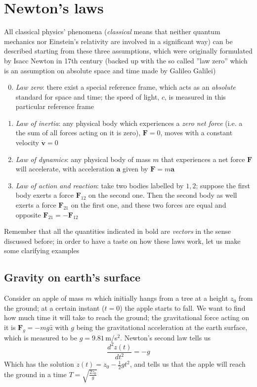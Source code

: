 \section{Newton's laws}
All classical physics' phenomena (\textit{classical} means that neither quantum mechanics nor Einstein's relativity are involved in a significant way) can be described starting from these three assumptions, which were originally formulated by Isacc Newton in 17th century (backed up with the so called ''law zero'' which is an assumption on absolute space and time made by Galileo Galilei)
\begin{enumerate}
\setcounter{enumi}{-1}
\item \textit{Law zero}: there exist a special reference frame, which acts as an \textit{absolute} standard for space and time; the speed of light, $c$, is measured in this particular reference frame 
\item \textit{Law of inertia}: any physical body which experiences a \textit{zero net force} (i.e. a the sum of all forces acting on it is zero), $\mathbf{F}=0$, moves with a constant velocity $\dot{\mathbf{v}}=0$
\item \textit{Law of dynamics}: any physical body of mass $m$ that experiences a net force $\mathbf{F}$ will accelerate, with acceleration $\mathbf{a}$ given by $\mathbf{F}=m\mathbf{a}$
\item \textit{Law of action and reaction}: take two bodies labelled by $1,2$; suppose the first body exerts a force $\mathbf{F}_{12}$ on the second one. Then the second body as well exerts a force $\mathbf{F}_{21}$ on the first one, and these two forces are equal and opposite $\mathbf{F}_{21}=-\mathbf{F}_{12}$ 
\end{enumerate} 
Remember that all the quantities indicated in bold are \textit{vectors} in the sense discussed before; in order to have a taste on how these laws work, let us make some clarifying examples
\subsection{Gravity on earth's surface}
Consider an apple of mass $m$ which initially hangs from a tree at a height $z_0$ from the ground; at a certain instant ($t=0$) the apple starts to fall. We want to find how much time it will take to reach the ground; the gravitational force acting on it is $\mathbf{F}_g=-mg\hat{z}$ with $g$ being the gravitational acceleration at the earth surface, which is measured to be $g=9.81$\,m/s$^2$. Newton's second law tells us
\begin{equation}
\frac{d^2z(t)}{dt^2}=-g
\end{equation}
Which has the solution $z(t)=z_0-\frac{1}{2}gt^2$, and tells us that the apple will reach the ground in a time $T=\sqrt{\frac{2z_0}{g}}$
